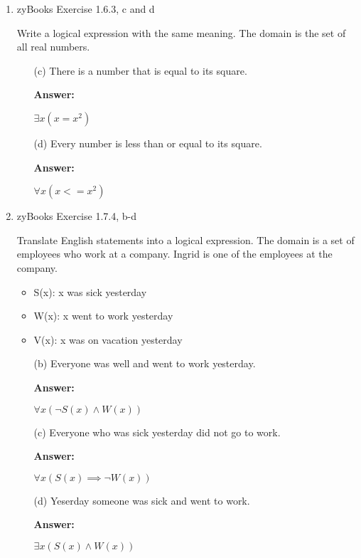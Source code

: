 \documentclass[12pt]{extreport}
\newcommand{\answer}[0]{\medskip \textbf{Answer:} \medskip}
\begin{document}
\begin{enumerate}
    
    \item zyBooks Exercise 1.6.3, c and d
    
    Write a logical expression with the same meaning. The domain is the set of all real numbers.
    
        \begin{enumerate}
            
            \item[(c)] There is a number that is equal to its square.
            
                \answer

                \( \exists x (x = x^2) \)

            \item[(d)] Every number is less than or equal to its square.
            
                \answer

                \( \forall x (x <= x^2) \)

        \end{enumerate}

    \item zyBooks Exercise 1.7.4, b-d
    
    Translate English statements into a logical expression. The domain is a set of employees who work at a company. Ingrid is one of the employees at the company.

    \begin{itemize}
        \item S(x): x was sick yesterday
        \item W(x): x went to work yesterday
        \item V(x): x was on vacation yesterday
    \end{itemize}
    
        \begin{enumerate}
            
            \item[(b)] Everyone was well and went to work yesterday.
            
                \answer

                \( \forall x (\neg S(x) \land W(x)) \)

            \item[(c)] Everyone who was sick yesterday did not go to work.
            
                \answer

                \( \forall x (S(x) \implies \neg W(x)) \)

            \item[(d)] Yeserday someone was sick and went to work.
            
                \answer

                \( \exists x (S(x) \land W(x)) \)

        \end{enumerate}

\end{enumerate}
\newpage
\end{document}

